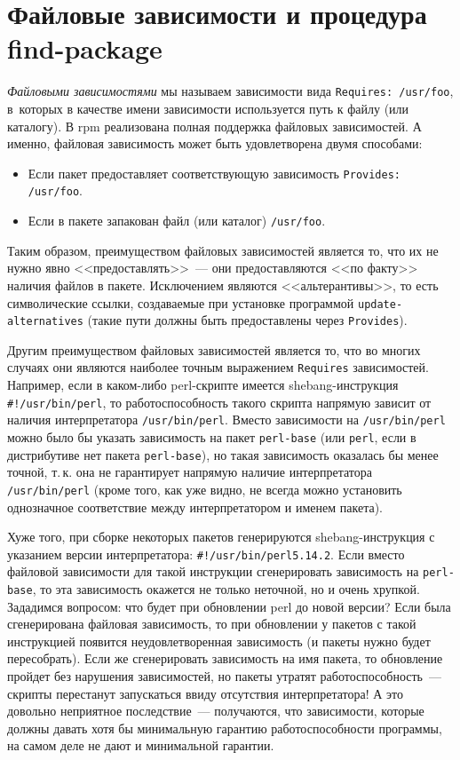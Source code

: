 \documentclass[russian,a4paper,12pt,titlepage]{article}
\begin{document}
\section{Файловые зависимости и процедура find-package}
\label{file-deps}\textit{Файловыми зависимостями} мы называем зависимости вида \verb|Requires: /usr/foo|,
в~которых в качестве имени зависимости используется путь к файлу (или каталогу).  В rpm реализована
полная поддержка файловых зависимостей.  А именно, файловая зависимость может быть удовлетворена двумя способами:
\begin{itemize}
\item Если пакет предоставляет соответствующую зависимость \verb|Provides: /usr/foo|.
\item Если в пакете запакован файл (или каталог) \verb|/usr/foo|.
\end{itemize}
Таким образом, преимуществом файловых зависимостей является то, что их не нужно явно <<предоставлять>>~---
они предоставляются <<по факту>> наличия файлов в пакете.  Исключением являются <<альтерантивы>>, то есть
символические ссылки, создаваемые при установке программой \verb|update-alternatives| (такие пути должны
быть предоставлены через \verb|Provides|).

Другим преимуществом файловых зависимостей является то, что во многих случаях они являются наиболее точным
выражением \verb|Requires| зависимостей.  Например, если в каком-либо perl-скрипте имеется shebang-инструкция
\verb|#!/usr/bin/perl|, то работоспособность такого скрипта напрямую зависит от наличия интерпретатора \verb|/usr/bin/perl|.
Вместо зависимости на \verb|/usr/bin/perl| можно было бы указать зависимость на пакет \verb|perl-base| (или \verb|perl|,
если в дистрибутиве нет пакета \verb|perl-base|), но такая зависимость оказалась бы менее точной, т.\,к. она не гарантирует
напрямую наличие интерпретатора \verb|/usr/bin/perl| (кроме того, как уже видно, не всегда можно установить однозначное
соответствие между интерпретатором и именем пакета).

Хуже того, при сборке некоторых пакетов генерируются shebang-инструкция с указанием версии интерпретатора: \verb|#!/usr/bin/perl5.14.2|.
Если вместо файловой зависимости для такой инструкции сгенерировать зависимость на \verb|perl-base|, то эта зависимость
окажется не только неточной, но и очень хрупкой.  Зададимся вопросом: что будет при обновлении perl до новой версии?
Если была сгенерирована файловая зависимость, то при обновлении у пакетов с такой инструкцией появится неудовлетворенная
зависимость (и пакеты нужно будет пересобрать).  Если же сгенерировать зависимость на имя пакета, то обновление пройдет
без нарушения зависимостей, но пакеты утратят работоспособность~--- скрипты перестанут запускаться ввиду отсутствия
интерпретатора!  А это довольно неприятное последствие~--- получаются, что зависимости, которые
должны давать хотя бы минимальную гарантию работоспособности программы, на самом деле не дают и минимальной гарантии.
\end{document}
